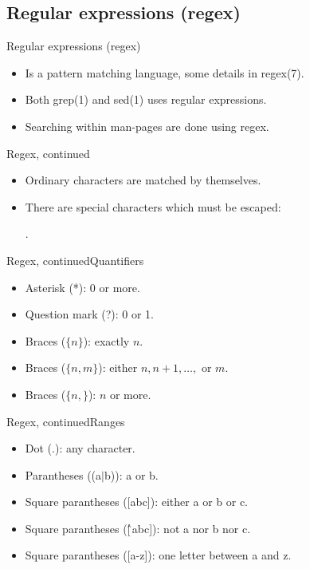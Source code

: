 \documentclass[handout]{beamer}
\begin{document}
\subsection{Regular expressions (regex)}
\begin{frame}{Regular expressions (regex)}
	\begin{itemize}
		\item Is a pattern matching language, some details in regex(7).
		\item Both grep(1) and sed(1) uses regular expressions.
		\item Searching within man-pages are done using regex.
	\end{itemize}
\end{frame}
\begin{frame}{Regex, continued}
	\begin{itemize}
		\item Ordinary characters are matched by themselves.
		\item There are special characters which must be escaped:
			\begin{center}
				.
			\end{center}
	\end{itemize}
\end{frame}
\begin{frame}{Regex, continued}{Quantifiers}
	\begin{itemize}
		\item Asterisk (*): 0 or more.
		\item Question mark (?): 0 or 1.
		\item Braces (\(\{n\}\)): exactly \(n\).
		\item Braces (\(\{n,m\}\)): either \(n, n+1, \ldots,\) or \(m\).
		\item Braces (\(\{n,\}\)): \(n\) or more.
	\end{itemize}
\end{frame}
\begin{frame}{Regex, continued}{Ranges}
	\begin{itemize}
		\item Dot (.): any character.
		\item Parantheses ((a$|$b)): a or b.
		\item Square parantheses ([abc]): either a or b or c.
		\item Square parantheses ([\^\,abc]): not a nor b nor c.
		\item Square parantheses ([a-z]): one letter between a and z.
	\end{itemize}
\end{frame}
\end{document}
